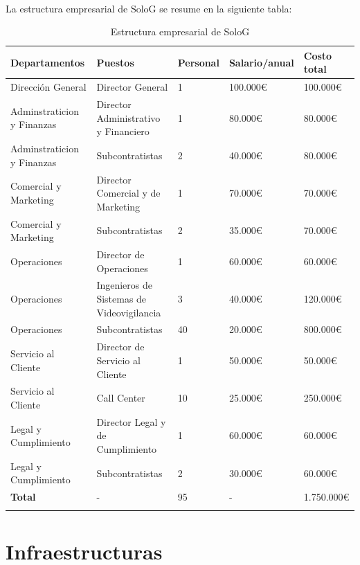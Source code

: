 \documentclass{report}
\begin{document}
          \paragraph{}
          {
            La estructura empresarial de SoloG se resume en la siguiente tabla:
          }
          \begin{longtable}{|p{3cm}|p{3cm}|p{3cm}|p{3cm}|p{3cm}|}
            \hline
            \textbf{Departamentos} & \textbf{Puestos} & \textbf{Personal} & \textbf{Salario/anual} & \textbf{Costo total}\\
            \hline
            \hline
            Dirección General & Director General & 1 & 100.000€ & 100.000€\\
            \hline
            Adminstraticion y Finanzas & Director Administrativo y Financiero & 1 & 80.000€ & 80.000€\\
            \hline
            Adminstraticion y Finanzas & Subcontratistas & 2 & 40.000€ & 80.000€\\
            \hline
            Comercial y Marketing & Director Comercial y de Marketing & 1 & 70.000€ & 70.000€\\
            \hline
            Comercial y Marketing & Subcontratistas & 2 & 35.000€ & 70.000€\\
            \hline
            Operaciones & Director de Operaciones & 1 & 60.000€ & 60.000€\\
            \hline
            Operaciones & Ingenieros de Sistemas de Videovigilancia & 3 & 40.000€ & 120.000€\\
            \hline
            Operaciones & Subcontratistas & 40 & 20.000€ & 800.000€\\
            \hline
            Servicio al Cliente & Director de Servicio al Cliente & 1 & 50.000€ & 50.000€\\
            \hline
            Servicio al Cliente & Call Center & 10 & 25.000€ & 250.000€\\
            \hline
            Legal y Cumplimiento & Director Legal y de Cumplimiento & 1 & 60.000€ & 60.000€\\
            \hline
            Legal y Cumplimiento & Subcontratistas & 2 & 30.000€ & 60.000€\\
            \hline
            \textbf{Total}& - & 95 & - & 1.750.000€\\
            \hline
            \caption{Estructura empresarial de SoloG}
          \end{longtable}
        \clearpage\section{Infraestructuras}
\end{document}

